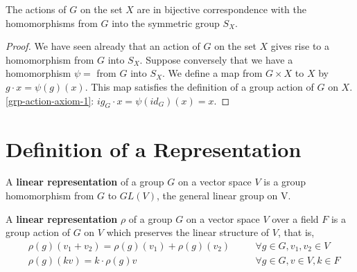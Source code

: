 \begin{prop} 
The actions of $G$ on the set $X$ are in bijective correspondence with the homomorphisms from $G$ into the symmetric group $S_X$.
\end{prop}
\begin{proof}
We have seen already that an action of $G$ on the set $X$ gives rise to a homomorphism from $G$ into $S_X$.  Suppose conversely that we have a homomorphism $\psi =$ from $G$ into $S_X$.  We define a map from $G \times X$ to $X$  by $g \cdot x = \psi(g)(x)$. This map satisfies the definition of a group action of $G$ on $X$.
\ref{grp-action-axiom-1}: $ig_G \cdot x = \psi(id_G)(x) = x$.

\end{proof}


\section{Definition of a Representation}
\begin{defn}
\label{repdef1}
A \textbf{linear representation} of a group $G$ on a vector space $V$  is a group homomorphism from $G$ to $GL(V)$, the general linear group on V. \end{defn}
 

\begin{defn}\label{repdef2}A \textbf{linear representation} $\rho$ of a group $G$ on a vector space $V$ over a field $F$ is a group action of $G$ on $V$ which preserves the linear structure of $V$, that is, 
\begin{align}
\label{rep-axiom-1}&\rho(g)(v_1+v_2)=\rho(g)(v_1)+\rho(g)(v_2) \quad && \forall g \in G, v_1, v_2 \in V \\
\label{rep-axiom-2}&\rho(g)(kv) = k \cdot \rho(g)v \quad && \forall g \in G, v \in V, k \in F
\end{align}
 \end{defn}
 
